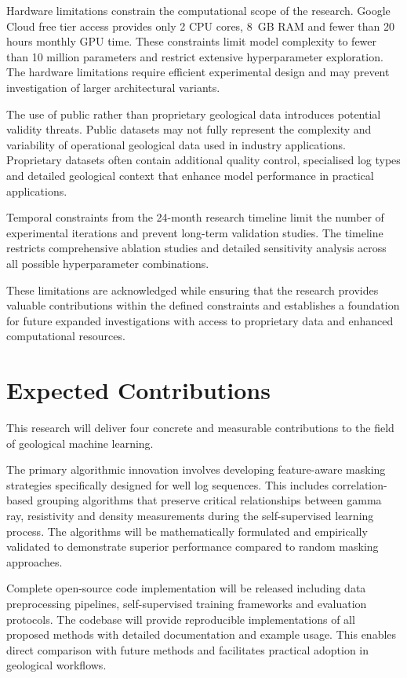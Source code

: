 Hardware limitations constrain the computational scope of the research. Google Cloud free tier access provides only 2 CPU cores, 8~GB RAM and fewer than 20 hours monthly GPU time. These constraints limit model complexity to fewer than 10 million parameters and restrict extensive hyperparameter exploration. The hardware limitations require efficient experimental design and may prevent investigation of larger architectural variants.

The use of public rather than proprietary geological data introduces potential validity threats. Public datasets may not fully represent the complexity and variability of operational geological data used in industry applications. Proprietary datasets often contain additional quality control, specialised log types and detailed geological context that enhance model performance in practical applications.

Temporal constraints from the 24-month research timeline limit the number of experimental iterations and prevent long-term validation studies. The timeline restricts comprehensive ablation studies and detailed sensitivity analysis across all possible hyperparameter combinations.

These limitations are acknowledged while ensuring that the research provides valuable contributions within the defined constraints and establishes a foundation for future expanded investigations with access to proprietary data and enhanced computational resources.


\section{Expected Contributions}

This research will deliver four concrete and measurable contributions to the field of geological machine learning.

The primary algorithmic innovation involves developing feature-aware masking strategies specifically designed for well log sequences. This includes correlation-based grouping algorithms that preserve critical relationships between gamma ray, resistivity and density measurements during the self-supervised learning process. The algorithms will be mathematically formulated and empirically validated to demonstrate superior performance compared to random masking approaches.

Complete open-source code implementation will be released including data preprocessing pipelines, self-supervised training frameworks and evaluation protocols. The codebase will provide reproducible implementations of all proposed methods with detailed documentation and example usage. This enables direct comparison with future methods and facilitates practical adoption in geological workflows.

